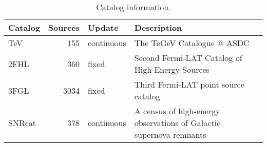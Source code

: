 \begin{table}[tb]

\caption{Catalog information.}
\label{tab:cats}
\begin{tabular}{ lrll }
\hline


Catalog & Sources & Update & Description \\ \hline
TeV & 155 & continuous & The TeGeV Catalogue @ ASDC\\
2FHL & 360 & fixed & Second Fermi-LAT Catalog of High-Energy Sources\\
3FGL & 3034 & fixed & Third Fermi-LAT point source catalog\\
SNRcat & 378 & continuous & A census of high-energy observations of Galactic supernova remnants\\
\hline
\end{tabular}
\end{table}
